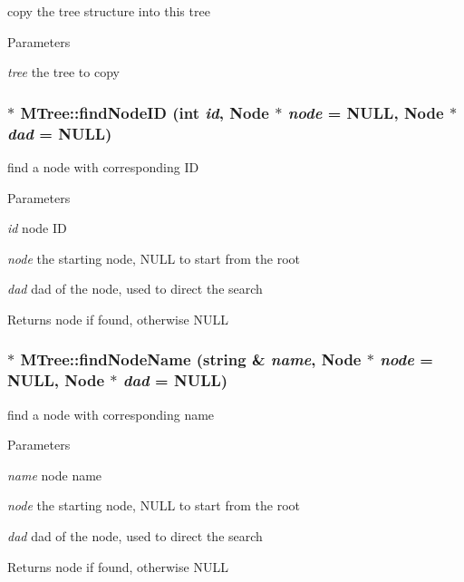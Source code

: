 \label{classMTree_ae1f6543f83abd7236065218131d7ea4b}
copy the tree structure into this tree 
\begin{DoxyParams}{Parameters}
\item[{\em tree}]the tree to copy \end{DoxyParams}
\hypertarget{classMTree_a391cb6c0dc914177caa89a42a5fb8dcc}{
\subsubsection[{findNodeID}]{ $\ast$ MTree::findNodeID (int {\em id}, \/  {\bf Node} $\ast$ {\em node} = {\ttfamily NULL}, \/  {\bf Node} $\ast$ {\em dad} = {\ttfamily NULL})}}
\label{classMTree_a391cb6c0dc914177caa89a42a5fb8dcc}
find a node with corresponding ID 
\begin{DoxyParams}{Parameters}
\item[{\em id}]node ID \item[{\em node}]the starting node, NULL to start from the root \item[{\em dad}]dad of the node, used to direct the search \end{DoxyParams}
\begin{DoxyReturn}{Returns}
node if found, otherwise NULL 
\end{DoxyReturn}
\hypertarget{classMTree_a9bccf760c31c8eb021c4c93eb40575ed}{
\subsubsection[{findNodeName}]{ $\ast$ MTree::findNodeName (string \& {\em name}, \/  {\bf Node} $\ast$ {\em node} = {\ttfamily NULL}, \/  {\bf Node} $\ast$ {\em dad} = {\ttfamily NULL})}}
\label{classMTree_a9bccf760c31c8eb021c4c93eb40575ed}
find a node with corresponding name 
\begin{DoxyParams}{Parameters}
\item[{\em name}]node name \item[{\em node}]the starting node, NULL to start from the root \item[{\em dad}]dad of the node, used to direct the search \end{DoxyParams}
\begin{DoxyReturn}{Returns}
node if found, otherwise NULL 
\end{DoxyReturn}
